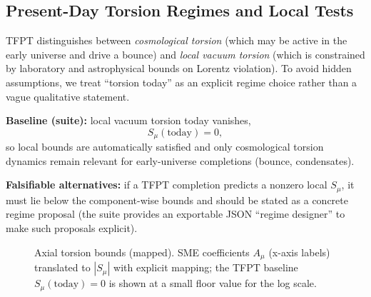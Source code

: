 \subsection{Present-Day Torsion Regimes and Local Tests}
\label{sec:torsion-regimes}

TFPT distinguishes between \emph{cosmological torsion} (which may be active in the early universe and drive a bounce) and \emph{local vacuum torsion} (which is constrained by laboratory and astrophysical bounds on Lorentz violation).
To avoid hidden assumptions, we treat ``torsion today'' as an explicit regime choice rather than a vague qualitative statement.

\begin{tcolorbox}[colback=yellow!3, colframe=yellow!60!black,
    title={\textbf{Regime declaration (baseline vs.\ falsifiable alternatives)}}, fonttitle=\bfseries\small]
\textbf{Baseline (suite):} local vacuum torsion today vanishes,
\[
S_\mu(\text{today})=0,
\]
so local bounds are automatically satisfied and only cosmological torsion dynamics remain relevant for early-universe completions (bounce, condensates).

\textbf{Falsifiable alternatives:} if a TFPT completion predicts a nonzero local $S_\mu$, it must lie below the component-wise bounds and should be stated as a concrete regime proposal (the suite provides an exportable JSON ``regime designer'' to make such proposals explicit).
\end{tcolorbox}

\TFPTTorsionBoundsTable

\begin{figure}[H]
\centering
{}
\caption{Axial torsion bounds (mapped). SME coefficients $A_\mu$ (x-axis labels) translated to $|S_\mu|$ with explicit mapping; the TFPT baseline $S_\mu(\text{today})=0$ is shown at a small floor value for the log scale.}
\label{fig:torsion-bounds}
\end{figure}

